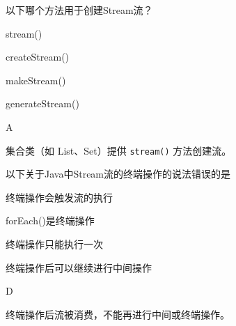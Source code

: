 \begin{question}
	以下哪个方法用于创建Stream流？
	\begin{options}
		\item stream()
		\item createStream()
		\item makeStream()
		\item generateStream()
	\end{options}
	\begin{answer}
		A
	\end{answer}
	\begin{explanation}
		集合类（如 List、Set）提供 \texttt{stream()} 方法创建流。
	\end{explanation}
\end{question}

\begin{question}
	以下关于Java中Stream流的终端操作的说法错误的是
	\begin{options}
		\item 终端操作会触发流的执行
		\item forEach()是终端操作
		\item 终端操作只能执行一次
		\item 终端操作后可以继续进行中间操作
	\end{options}
	\begin{answer}
		D
	\end{answer}
	\begin{explanation}
		终端操作后流被消费，不能再进行中间或终端操作。
	\end{explanation}
\end{question}
